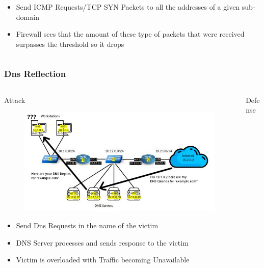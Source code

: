 \documentclass{beamer}
\begin{document}
\begin{frame}
\begin{columns}
\begin{column}{0.5\textwidth}
\begin{figure}
        \end{figure}
            \begin{itemize}[label={}]
                \item \footnotesize Send ICMP Requests/TCP SYN Packets to all the addresses of a given sub-domain
                \item \footnotesize Firewall sees that the amount of these type of packets that were received surpasses the threshold so it drops
            \end{itemize}
    \end{column}
\end{columns}
\end{frame}

\begin{frame}
\frametitle{Dns Reflection}
\begin{columns}
    \begin{column}{0.5\textwidth}
        \Large Attack
        \begin{figure}
            \centering
            \includegraphics[width=\textwidth]{dns_attack.jpg}\\
        \end{figure}
            \begin{itemize}[label={}]
                \item \footnotesize Send Dns Requests in the name of the victim
                \item \footnotesize DNS Server processes and sends response to the victim
                \item \footnotesize Victim is overloaded with Traffic becoming Unavailable
            \end{itemize}
    \end{column}
    \begin{column}{0.5\textwidth}
        \Large Defense

\end{column}
\end{columns}
\end{frame}
\end{document}
